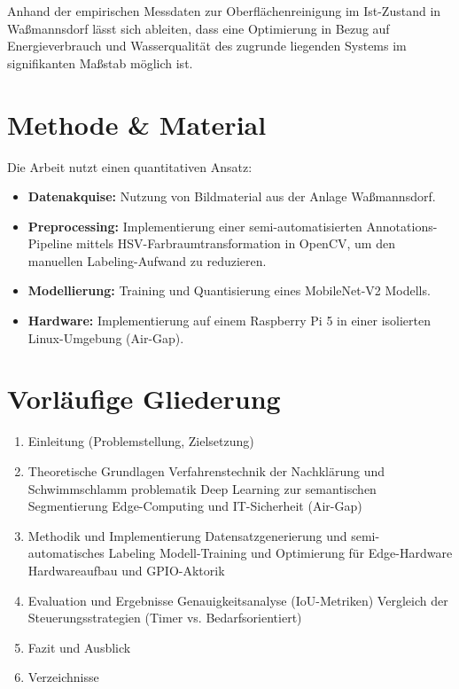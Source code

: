 Anhand der empirischen Messdaten zur Oberflächenreinigung im Ist-Zustand in Waßmannsdorf lässt sich ableiten, dass eine Optimierung in Bezug auf Energieverbrauch und Wasserqualität des zugrunde liegenden Systems im signifikanten Maßstab möglich ist. 

\section{Methode \& Material}
Die Arbeit nutzt einen quantitativen Ansatz:
\begin{itemize}
    \item \textbf{Datenakquise:} Nutzung von Bildmaterial aus der Anlage Waßmannsdorf.
    \item \textbf{Preprocessing:} Implementierung einer semi-automatisierten Annotations-Pipeline mittels HSV-Farbraumtransformation in OpenCV, um den manuellen Labeling-Aufwand zu reduzieren.
    \item \textbf{Modellierung:} Training und Quantisierung eines MobileNet-V2 Modells.
    \item \textbf{Hardware:} Implementierung auf einem Raspberry Pi 5 in einer isolierten Linux-Umgebung (Air-Gap).
\end{itemize}

\section{Vorläufige Gliederung}
\begin{enumerate}
    \item Einleitung (Problemstellung, Zielsetzung)
    \item Theoretische Grundlagen
         Verfahrenstechnik der Nachklärung und Schwimmschlamm
        problematik
         Deep Learning zur semantischen Segmentierung
         Edge-Computing und IT-Sicherheit (Air-Gap)
    \item Methodik und Implementierung
         Datensatzgenerierung und semi-automatisches Labeling
         Modell-Training und Optimierung für Edge-Hardware
         Hardwareaufbau und GPIO-Aktorik
    \item Evaluation und Ergebnisse
         Genauigkeitsanalyse (IoU-Metriken)
         Vergleich der Steuerungsstrategien (Timer vs. Bedarfsorientiert)
    \item Fazit und Ausblick
    \item Verzeichnisse
\end{enumerate}

